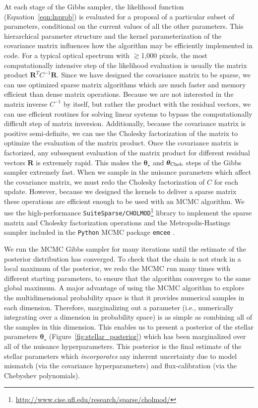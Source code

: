 \documentclass[iop,floatfix]{emulateapj}
\newcommand{\vt}{ {\bm \theta}}
\newcommand{\vtstar}{\vt_{\star}}
\newcommand{\vtcheb}{\vt_{\rm Cheb}}
\newcommand{\fR}{ {\bm R}}
\begin{document}
At each stage of the Gibbs sampler, the likelihood function (Equation~\ref{eqn:lnprob}) is evaluated for a proposal of a particular subset of parameters, conditional on the current values of all the other parameters. This hierarchical parameter structure and the kernel parameterization of the covariance matrix influences how the algorithm may be efficiently implemented in code. For a typical optical spectrum with $\gtrsim$1,000 pixels, the most computationally intensive step of the likelihood evaluation is usually the matrix product $\fR^T C^{-1} \fR$. Since we have designed the covariance matrix to be sparse, we can use optimized sparse matrix algorithms which are much faster and memory efficient than dense matrix operations. Because we are not interested in the matrix inverse $C^{-1}$ by itself, but rather the product with the residual vectors, we can use efficient routines for solving linear systems to bypass the computationally difficult step of matrix inversion. Additionally, because the covariance matrix is positive semi-definite, we can use the Cholesky factorization of the matrix to optimize the evaluation of the matrix product. Once the covariance matrix is factorized, any subsequent evaluation of the matrix product for different residual vectors $\fR$ is extremely rapid. This makes the $\vtstar$ and $\vtcheb$ steps of the Gibbs sampler extremely fast.
When we sample in the nuisance parameters which affect the covariance matrix, we must redo the Cholesky factorization of $C$ for each update. However, because we designed the kernels to deliver a sparse matrix these operations are efficient enough to be used with an MCMC algorithm.  We use the high-performance \texttt{SuiteSparse/CHOLMOD}\footnote{\url{http://www.cise.ufl.edu/research/sparse/cholmod/}} library to implement the sparse matrix and Cholesky factorization operations \citep{chen08, davis09} and the Metropolis-Hastings sampler included in the \texttt{Python} MCMC package \texttt{emcee} \citep{foreman-mackey12}.

We run the MCMC Gibbs sampler for many iterations until the estimate of the posterior distribution has converged. To check that the chain is not stuck in a local maximum of the posterior, we redo the MCMC run many times with different starting parameters, to ensure that the algorithm converges to the same global maximum. A major advantage of using the MCMC algorithm to explore the multidimensional probability space is that it provides numerical samples in each dimension. Therefore, marginalizing out a parameter (i.e., numerically integrating over a dimension in probability space) is as simple as combining all of the samples in this dimension. This enables us to present a posterior of the stellar parameters $\vtstar$ (Figure~\ref{fig:stellar_posterior}) which has been marginalized over all of the nuisance hyperparameters. This posterior is the final estimate of the stellar parameters which \emph{incorporates} any inherent uncertainty due to model mismatch (via the covariance hyperparameters) and flux-calibration (via the Chebyshev polynomials).
\end{document}
